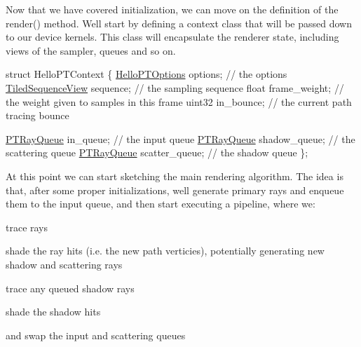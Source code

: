 \begin{DoxyParagraph}{}
Now that we have covered initialization, we can move on the definition of the render() method. We\textquotesingle{}ll start by defining a context class that will be passed down to our device kernels. This class will encapsulate the renderer state, including views of the sampler, queues and so on. ~\newline

\begin{DoxyCode}
\textcolor{keyword}{struct }HelloPTContext
\{
    \hyperlink{struct_hello_p_t_options}{HelloPTOptions}       options;        \textcolor{comment}{// the options}
    \hyperlink{struct_tiled_sequence_view}{TiledSequenceView}    sequence;       \textcolor{comment}{// the sampling sequence}
    \textcolor{keywordtype}{float}                frame\_weight;   \textcolor{comment}{// the weight given to samples in this frame}
    uint32               in\_bounce;      \textcolor{comment}{// the current path tracing bounce}

    \hyperlink{struct_p_t_ray_queue}{PTRayQueue}           in\_queue;       \textcolor{comment}{// the input queue}
    \hyperlink{struct_p_t_ray_queue}{PTRayQueue}           shadow\_queue;   \textcolor{comment}{// the scattering queue}
    \hyperlink{struct_p_t_ray_queue}{PTRayQueue}           scatter\_queue;  \textcolor{comment}{// the shadow queue}
\};
\end{DoxyCode}

\end{DoxyParagraph}
\begin{DoxyParagraph}{}
At this point we can start sketching the main rendering algorithm. The idea is that, after some proper initializations, we\textquotesingle{}ll generate primary rays and enqueue them to the input queue, and then start executing a pipeline, where we\+: 
\end{DoxyParagraph}
\begin{DoxyParagraph}{}

\begin{DoxyEnumerate}
\item trace rays
\item shade the ray hits (i.\+e. the new path verticies), potentially generating new shadow and scattering rays
\item trace any queued shadow rays
\item shade the shadow hits
\item and swap the input and scattering queues
\end{DoxyEnumerate}
\end{DoxyParagraph}
